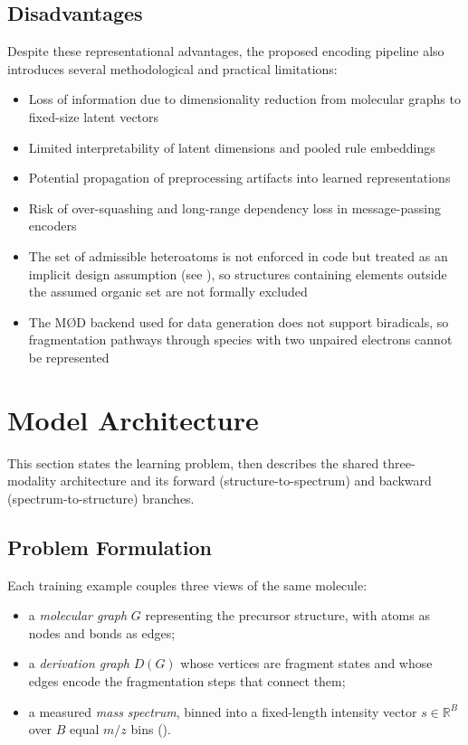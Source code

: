 \subsection{Disadvantages}
\label{sec:disadvantages}
Despite these representational advantages, the proposed encoding pipeline also introduces several methodological and practical limitations:

\begin{itemize}
    \item Loss of information due to dimensionality reduction from molecular graphs to fixed-size latent vectors
    \item Limited interpretability of latent dimensions and pooled rule embeddings
    \item Potential propagation of preprocessing artifacts into learned representations
    \item Risk of over-squashing and long-range dependency loss in message-passing encoders
    \item The set of admissible heteroatoms is not enforced in code but treated as an implicit design assumption (see ), so structures containing elements outside the assumed organic set are not formally excluded
    \item The M\O D backend used for data generation does not support biradicals, so fragmentation pathways through species with two unpaired electrons cannot be represented
\end{itemize}


\section{Model Architecture}

This section states the learning problem, then describes the shared three-modality architecture and its forward (structure-to-spectrum) and backward (spectrum-to-structure) branches.

\subsection{Problem Formulation}
\label{sec:problem-formulation}

Each training example couples three views of the same molecule:
\begin{itemize}
    \item a \emph{molecular graph} $G$ representing the precursor structure, with atoms as nodes and bonds as edges;
    \item a \emph{derivation graph} $D(G)$ whose vertices are fragment states and whose edges encode the fragmentation steps that connect them;
    \item a measured \emph{mass spectrum}, binned into a fixed-length intensity vector $s \in \mathbb{R}^{B}$ over $B$ equal $m/z$ bins ().
\end{itemize}

